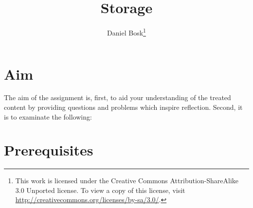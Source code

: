 \documentclass[a4paper]{miunasgn}
\title{Storage}
\author{Daniel Bosk\footnote{%
	This work is licensed under the Creative Commons Attribution-ShareAlike 3.0 
	Unported license.
	To view a copy of this license, visit 
	\url{http://creativecommons.org/licenses/by-sa/3.0/}.
}}
\date{\svnId}
\begin{document}
\maketitle
\thispagestyle{foot}
\tableofcontents


\section{Aim}
\label{sec:Aim}
The aim of the assignment is, first, to aid your understanding of the treated 
content by providing questions and problems which inspire reflection.
Second, it is to examinate the following:
\begin{itemize}
	
\end{itemize}


\section{Prerequisites}
\label{sec:Prerequisites}

\end{document}
